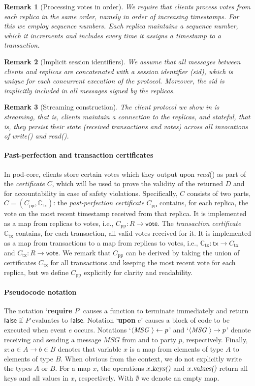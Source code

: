 \documentclass[pdflatex,sn-mathphys-num]{sn-jnl}%
\theoremstyle{thmstyleone}%
\theoremstyle{thmstyletwo}%
\newtheorem{remark}{Remark}%
\theoremstyle{thmstylethree}%
\newcommand{\podtm}{\textsf{pod}\xspace}
\newcommand{\false}{\mathsf{false}}
\newcommand{\op}[1]{\textsl{#1}}
\newcommand{\opwrite}[1]{\op{write}(#1)\xspace}
\newcommand{\opreadall}[1]{\op{read}(#1)\xspace}
\newcommand{\opKeys}{\op{keys()}\xspace}
\newcommand{\opValues}{\op{values()}\xspace}
\newcommand{\operand}[1]{\textsf{#1}}
\newcommand{\tx}{\operand{tx}\xspace}
\newcommand{\rep}{\ensuremath{R}\xspace}
\newcommand{\vote}{\operand{vote}\xspace}
\newcommand{\txcert}{\ensuremath{C_\text{tx}}\xspace}
\newcommand{\alltxcert}{\ensuremath{\mathbb{C}_\text{tx}}\xspace}
\newcommand{\ppcert}{\ensuremath{C_\text{pp}}\xspace}
\newcommand{\cert}{\ensuremath{C}\xspace}
\newcommand{\Pod}{\ensuremath{D}\xspace}
\newcommand{\dotparagraph}[1]{\paragraph*{#1}}
\newcommand{\msg}[2]{\ensuremath{\langle\textit{\uppercase{#1 }}#2\rangle}\xspace}
\begin{document}
\begin{remark}[Processing votes in order]
    We require that clients process votes from each replica in the same order, namely in order of increasing timestamps. For this we employ \emph{sequence numbers}. Each replica maintains a sequence number, which it increments and includes every time it assigns a timestamp to a transaction.
\end{remark}
\begin{remark}[Implicit session identifiers]
We assume that all messages between clients and replicas are concatenated with a session identifier (sid), which is unique for each concurrent execution of the protocol. Moreover, the sid is implicitly included in all messages signed by the replicas.
\end{remark}
\begin{remark}[Streaming construction]
    The client protocol we show in  is \emph{streaming}, that is, clients maintain a connection to the replicas, and \emph{stateful}, that is, they persist their state (received transactions and votes) across all invocations of \opwrite{} and \opreadall{}.
\end{remark}

\dotparagraph{Past-perfection and transaction certificates}
In \podtm-core, clients store certain votes which they output upon \opreadall{} as part of the \emph{certificate} \cert, which will be used to prove the validity of the returned \Pod and for accountability in case of safety violations.
Specifically, \cert consists of two parts, $\cert = (\ppcert, \alltxcert)$: the \emph{past-perfection certificate} \ppcert contains, for each replica, the vote on the most recent timestamp received from that replica. It is implemented as a map from replicas to votes, i.e., $\ppcert: \rep \rightarrow \vote$.
The \emph{transaction certificate} \alltxcert contains, for each transaction, all valid votes received for it.
It is implemented as a map from transactions to a map from replicas to votes, i.e., $\alltxcert: \tx \rightarrow \txcert$ and $\txcert: \rep \rightarrow \vote$.
We remark that $\ppcert$ can be derived by taking the union of certificates $\txcert$ for all transactions and keeping the most recent vote for each replica, but we define $\ppcert$ explicitly for clarity and readability.

\dotparagraph{Pseudocode notation}
The notation `\textbf{require} $P$' causes a function to terminate immediately and return $\false$ if $P$ evaluates to $\false$.
Notation `\textbf{upon} $e$' causes a block of code to be executed when event $e$ occurs.
Notations `$\msg{MSG}{} \leftarrow p$' and `$\msg{MSG}{} \rightarrow p$' denote receiving and sending a message $MSG$ from and to party $p$, respectively.
Finally, $x: a \in A \rightarrow b \in B$ denotes that variable $x$ is a map from elements of type $A$ to elements of type $B$. When obvious from the context, we do not explicitly write the types $A$ or $B$.
For a map $x$, the operations $x.\opKeys$ and $x.\opValues$ return all keys and all values in $x$, respectively.
With $\emptyset$ we denote an empty map.
\end{document}
